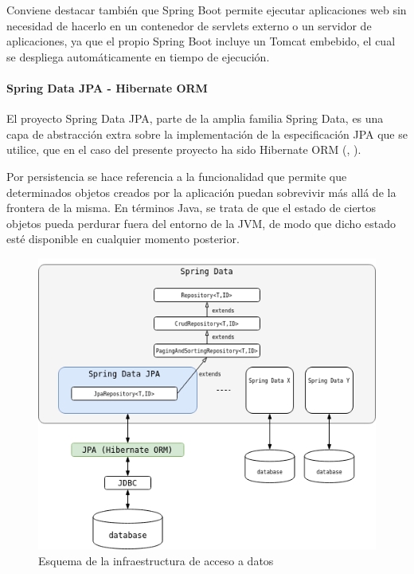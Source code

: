\documentclass[a4paper,12pt,twoside,openright]{report}
\begin{document}
    Conviene destacar también que Spring Boot permite ejecutar aplicaciones web sin necesidad de hacerlo en un contenedor de servlets externo o un servidor de aplicaciones, ya que el propio Spring Boot incluye un Tomcat embebido, el cual se despliega automáticamente en tiempo de ejecución.
    
    \paragraph{Spring Data JPA - Hibernate ORM}
    El proyecto Spring Data JPA, parte de la amplia familia Spring Data, es una capa de abstracción extra sobre la implementación de la especificación JPA que se utilice, que en el caso del presente proyecto ha sido Hibernate ORM (\cite{Tyson2019}, \cite{JanssenJPA}).
    
    Por persistencia se hace referencia a la funcionalidad que permite que determinados objetos creados por la aplicación puedan sobrevivir más allá de la frontera de la misma. En términos Java, se trata de que el estado de ciertos objetos pueda perdurar fuera del entorno de la JVM, de modo que dicho estado esté disponible en cualquier momento posterior.
    
    \begin{figure}[hbt!]
    	\centering
    	\includegraphics[width=\textwidth,keepaspectratio]{data_access}
    	\caption{Esquema de la infraestructura de acceso a datos}
    	\label{fig:data_access}
    \end{figure}
    
\end{document}
